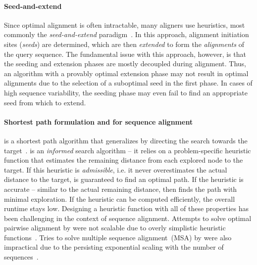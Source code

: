 \paragraph{Seed-and-extend}
Since optimal alignment is often intractable, many aligners use heuristics, most
commonly the \emph{seed-and-extend}
paradigm~\cite{altschul_basic_1990,langmead_fast_2012,li_fast_2009}. In this
approach, alignment initiation sites (\emph{seeds}) are determined, which are
then \emph{extended} to form the \emph{alignments} of the query sequence. The
fundamental issue with this approach, however, is that the seeding and extension
phases are mostly decoupled during alignment. Thus, an algorithm with a provably
optimal extension phase may not result in optimal alignments due to the
selection of a suboptimal seed in the first phase. In cases of high sequence
variability, the seeding phase may even fail to find an appropriate seed from
which to extend.

\paragraph{Shortest path formulation and \A for sequence alignment}
\A is a shortest path algorithm that generalizes \dijkstra by directing the
search towards the target~\citep{hart1968formal}. \A is an \emph{informed}
search algorithm -- it relies on a problem-specific heuristic function that
estimates the remaining distance from each explored node to the target. If this
heuristic is \emph{admissible}, i.e. it never overestimates the actual distance
to the target, \A is guaranteed to find an optimal path. If the heuristic is
accurate -- similar to the actual remaining distance, then \A finds the path
with minimal exploration. If the heuristic can be computed efficiently, the
overall runtime stays low. Designing a heuristic function with all of these
properties has been challenging in the context of sequence alignment. Attempts
to solve optimal pairwise alignment by \A were not scalable due to overly
simplistic heuristic functions~\cite{dox2018efficient}. Tries to solve multiple
sequence alignment~(MSA) by \A were also impractical due to the persisting
exponential scaling with the number of
sequences~\citep{lermen2000practical,zhou2002multiple,mcnaughton2002memory}.

